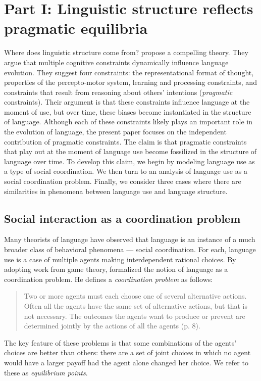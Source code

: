 \documentclass[man, noapacite, 12pt]{apa2}
\begin{document}
\section{Part I: Linguistic structure reflects pragmatic equilibria}

Where does linguistic structure come from?  propose a compelling theory. They argue that  multiple cognitive constraints dynamically influence language evolution. They suggest four constraints: the representational format of thought, properties of the percepto-motor system, learning and processing constraints, and constraints that result from reasoning about others' intentions ({\it pragmatic} constraints). Their argument is that these constraints  influence  language at the moment of use, but over time, these biases become instantiated in the structure of language. Although each of these constraints likely plays an important role in the evolution of language, the present paper focuses on the independent contribution of pragmatic constraints. The claim is that pragmatic constraints that play out at the moment of language use become fossilized in the structure of language over time. To develop this claim, we begin by modeling language use as a type of social coordination. We then turn to an analysis of language use as a social coordination problem. Finally, we consider three cases where there are similarities in phenomena between language use and language structure.

\subsection{Social interaction as a coordination problem}
Many theorists of language \cite{zipf1936, lewis1969convention, grice1975logic, clark1996using} have observed that language is an instance of a much broader class of behavioral phenomena --- social coordination. For each, language use is a case of multiple agents making interdependent  rational choices. By adopting work from game theory,   formalized the notion of language as a coordination problem. He defines a  {\it coordination problem} as follows: \begin{quote} Two or more agents must each choose one of several alternative actions. Often all the agents have the same set of alternative actions, but that is not necessary. The outcomes the agents want to produce or prevent are determined jointly by the actions of all the agents (p. 8).
\end{quote} 
The key feature of these problems is that some combinations of the agents' choices are better than others: there are a set of joint choices in which no agent would have a larger payoff had the agent alone changed her choice. We refer to these as {\it equilibrium points}. 
\end{document}
